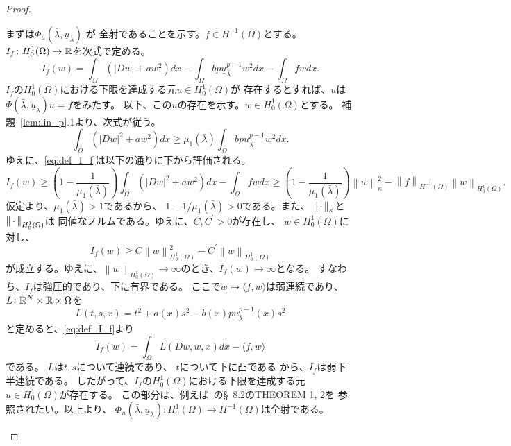 \begin{proof}
\begin{enumerate}[1.]
        まずは$\Phi_u (\bar{\lambda}, \underline{u}_{\bar{\lambda}})$
        が
        全射であることを示す。$f \in H^{-1}(\Omega)$とする。
        $I_f \colon H_0^1(\Omega) \to \mathbb{R}$を次式で定める。
        \begin{equation}
         I_f (w) = \int_\Omega \left( \lvert Dw \rvert + aw^2 \right)
          dx - \int_\Omega bp \underline{u}_{\bar{\lambda}}^{p-1} w^2
          dx - \int_\Omega fw dx. \label{eq:def_I_f}
        \end{equation}
        $I_f$の$H_0^1(\Omega)$における下限を達成する元$u \in
        H_0^1(\Omega)$が
        存在するとすれば、$u$は$\Phi(\bar{\lambda},
        \underline{u}_\lambda)u = f$をみたす。
        以下、この$u$の存在を示す。$w \in H_0^1(\Omega)$とする。
        補題~\ref{lem:lin_p}.1より、次式が従う。
        \begin{equation}
         \int_\Omega \left( \lvert Dw \rvert^2 + aw^2 \right) dx \geq
          \mu_1(\bar{\lambda}) \int_\Omega bp
          \underline{u}_{\bar{\lambda}}^{p-1} w^2 dx.
          \label{eq:mu_1_bar_lambda_r} 
        \end{equation}
        ゆえに、\eqref{eq:def_I_f}は以下の通りに下から評価される。
        \[
         I_f(w) \geq \left( 1 - \frac{1}{\mu_1(\bar{\lambda})} \right)
        \int_\Omega \left( \lvert Dw \rvert^2 + aw^2\right) dx -
        \int_\Omega fw dx \geq \left( 1 -
        \frac{1}{\mu_1(\bar{\lambda})} \right) \left\| w
        \right\|_\kappa^2 - \left\| f \right\|_{H^{-1}(\Omega)}
        \left\| w \right\|_{H_0^1(\Omega)}.
        \]
        仮定より、$\mu_1(\bar{\lambda}) > 1$であるから、
        $1 - 1/\mu_1(\bar{\lambda}) > 0$である。また、
        $\left\|\, \cdot \, \right\|_\kappa$と$\left\|\, \cdot \, \right\|_{H_0^1(\Omega)}$は
        同値なノルムである。ゆえに、$C, C^\prime > 0$が存在し、
        $w \in H_0^1(\Omega)$に対し、
        \[
         I_f (w) \geq C \left\| w \right\|^2_{H_0^1(\Omega)} -
          C^\prime \left\| w \right\|_{H_0^1(\Omega)}          
        \]
        が成立する。ゆえに、$\left\| w \right\|_{H_0^1(\Omega)} \to
        \infty$のとき、$I_f(w) \to \infty$となる。
        すなわち、$I_f$は強圧的であり、下に有界である。
        ここで$w \mapsto \langle f, w \rangle$は弱連続であり、
        $L \colon \mathbb{R}^N \times \mathbb{R} \times \Omega$を
        \[
         L(t, s, x) = t^2 + a(x)s^2 - b(x)p
        \underline{u}_{\bar{\lambda}}^{p-1}(x) s^2
        \]
        と定めると、\eqref{eq:def_I_f}より
        \[
         I_f (w) = \int_\Omega L(Dw, w, x) dx - \langle f , w \rangle
        \]
        である。
        $L$は$t, s$について連続であり、
        $t$について下に凸である
        から、$I_f$は弱下半連続である。
        したがって、$I_f$の$H_0^1(\Omega)$における下限を達成する元$u
        \in H_0^1(\Omega)$が存在する。
        この部分は、例えば~\cite{MR2597943}の\S~8.2のTHEOREM 1, 2を
        参照されたい。以上より、
        $\Phi_u (\bar{\lambda}, \underline{u}_{\bar{\lambda}}) \colon
        H_0^1(\Omega) \to H^{-1}(\Omega)$は全射である。
        

\end{enumerate}
\end{proof}
